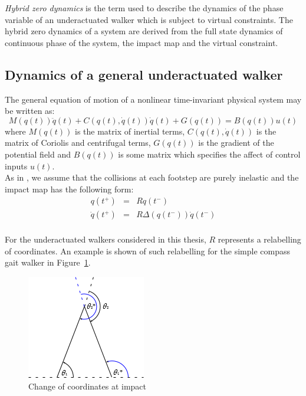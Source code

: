 \textit{Hybrid zero dynamics} is the term used to describe the dynamics of the phase variable of an underactuated walker which is subject to virtual constraints. The hybrid zero dynamics of a system are derived from the full state dynamics of continuous phase of the system, the impact map and the virtual constraint.

\subsection{Dynamics of a general underactuated walker}
The general equation of motion of a nonlinear time-invariant physical system may be written as:
\begin{equation}\label{eqn:dynamics}
	M\left(q(t)\right)\ddot{q}(t) + C\left(q(t),\dot{q}(t)\right)\dot{q}(t)
	 + G\left(q(t)\right) = B\left(q(t)\right)u(t)
\end{equation}
where $M\left(q(t)\right)$ is the matrix of inertial terms, $C\left(q(t),\dot{q}(t)\right)$ is the matrix of Coriolis and centrifugal terms, $G\left(q(t)\right)$ is the gradient of the potential field and $B\left(q(t)\right)$ is some matrix which specifies the affect of control inputs $u(t)$. \\

As in \cite{hurmuzlu1994rigid}, we assume that the collisions at each footstep are purely inelastic and the impact map has the following form:
\begin{eqnarray}
	q\left(t^+\right) &=& Rq\left(t^-\right) \\
	\dot{q}\left(t^+\right) &=& R\Delta\left(q\left(t^-\right)\right)\dot{q}\left(t^-\right)
\end{eqnarray} ~\\

For the underactuated walkers considered in this thesis, $R$ represents a relabelling of coordinates. An example is shown of such relabelling for the simple compass gait walker in Figure~\ref{fig:relabel}.

\begin{figure}[htp]
	\centering
	\includegraphics[scale=1]{../images/impact.png}
	\caption{Change of coordinates at impact}
	\label{fig:relabel}
\end{figure}

